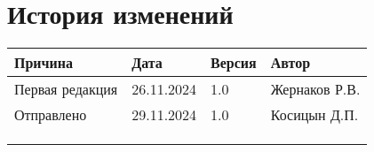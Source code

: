 \newpage


\section*{История изменений}
\noindent

\scriptsize
\begin{longtable}{|p{40mm}|p{20mm}|p{20mm}|p{60mm}|}
\hline
{\bf \parbox[c][5mm]{40mm}{\centering Причина}} & {\bf \parbox[c]{19mm}{\centering Дата}} & {\bf \parbox[c]{16mm}{\centering Версия}} & {\bf \parbox[c]{25mm}{\centering Автор}} \\
\hline
\parbox[c][9mm]{40mm}{Первая редакция} & \parbox{19mm}{26.11.2024} & \parbox{16mm}{1.0} & \parbox{60mm}{Жернаков Р.В.} \\
\hline
\parbox[c][9mm]{40mm}{Отправлено} & \parbox{19mm}{29.11.2024} & \parbox{16mm}{1.0} & \parbox{60mm}{Косицын Д.П.} \\
\hline
&&&\\
\hline
&&&\\
\hline
&&&\\
\hline
\end{longtable}  
\normalsize